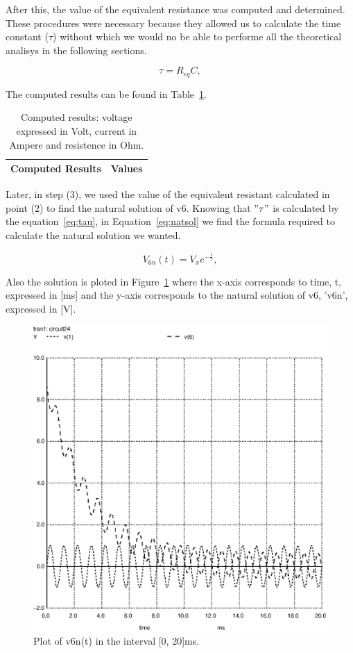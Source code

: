 After this, the value of the equivalent resistance was computed and determined. These procedures were necessary because they allowed us to calculate the time constant ($\tau$) without which we would no be able to performe all the theoretical analisys in the following sections. 

\begin{equation}
  \tau = R_{eq}C,
  \label{eq:tau}
\end{equation}


The computed results can be found in Table~\ref{tab:TA2}.

\begin{table}[h]
  \centering
  \begin{tabular}{|l|r|}
    \hline    
    {\bf Computed Results} & {\bf Values} \\ \hline
    
  \end{tabular}
  \caption{Computed results: voltage expressed in Volt, current in Ampere and resistence in Ohm.}
  \label{tab:TA2}
\end{table}

Later, in step (3), we used the value of the equivalent resistant calculated in point (2) to find the natural solution of v6. Knowing that $"\tau"$ is calculated by the equation~\ref{eq:tau}, in Equation~\ref{eq:natsol} we find the formula required to calculate the natural solution we wanted. 

\begin{equation}
  V_{6n}(t) = V_{x}e^{-\frac{t}{\tau}},
  \label{eq:natsol}
\end{equation}

Also the solution is ploted in Figure~\ref{fig:plotA(4)} where the x-axis corresponds to time, t, expressed in [ms] and the y-axis corresponds to the natural solution of v6, 'v6n', expressed in [V].

\vspace{5.0cm}

\begin{figure}[h] \centering
\includegraphics[width=0.8\linewidth]{forcedsolution.eps}
\caption{Plot of v6n(t) in the interval [0, 20]ms.}
\label{fig:plotA(4)}
\end{figure}

